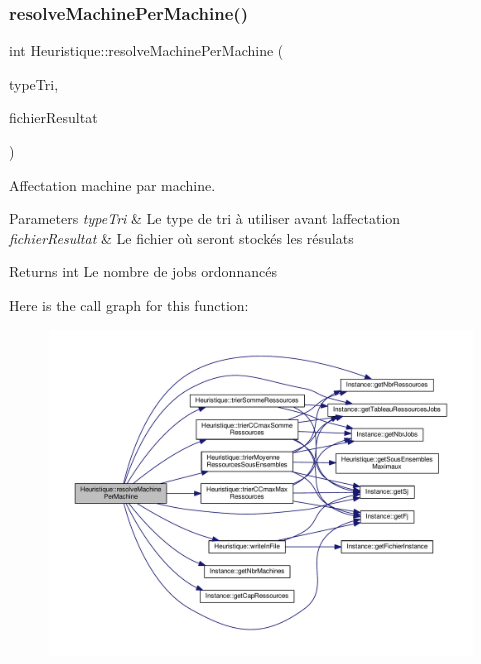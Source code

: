 \subsubsection{\texorpdfstring{resolve\+Machine\+Per\+Machine()}{resolveMachinePerMachine()}}
{\footnotesize\ttfamily int Heuristique\+::resolve\+Machine\+Per\+Machine (\begin{DoxyParamCaption}\item[{Q\+String}]{type\+Tri,  }\item[{Q\+String}]{fichier\+Resultat }\end{DoxyParamCaption})}



Affectation machine par machine. 


\begin{DoxyParams}{Parameters}
{\em type\+Tri} & Le type de tri à utiliser avant l\textquotesingle{}affectation \\
\hline
{\em fichier\+Resultat} & Le fichier où seront stockés les résulats \\
\hline
\end{DoxyParams}
\begin{DoxyReturn}{Returns}
int Le nombre de jobs ordonnancés 
\end{DoxyReturn}
Here is the call graph for this function\+:\nopagebreak
\begin{figure}[H]
\begin{center}
\leavevmode
\includegraphics[width=350pt]{classHeuristique_a49b20cab1a9055fddf0519fe7bf99c4a_cgraph}
\end{center}
\end{figure}
\mbox{\label{classHeuristique_a2b6477a1dde77d58415dd0bc75940352}} 
